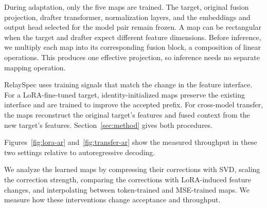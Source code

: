 During adaptation, only the five maps are trained. The target, original fusion projection, drafter transformer, normalization layers, and the embeddings and output head selected for the model pair remain frozen. A map can be rectangular when the target and drafter expect different feature dimensions. Before inference, we multiply each map into its corresponding fusion block, a composition of linear operations. This produces one effective projection, so inference needs no separate mapping operation.

RelaySpec uses training signals that match the change in the feature interface. For a LoRA-fine-tuned target, identity-initialized maps preserve the existing interface and are trained to improve the accepted prefix. For cross-model transfer, the maps reconstruct the original target's features and fused context from the new target's features. Section~\ref{sec:method} gives both procedures.

Figures~\ref{fig:lora-ar} and~\ref{fig:transfer-ar} show the measured throughput in these two settings relative to autoregressive decoding.

We analyze the learned maps by compressing their corrections with SVD, scaling the correction strength, comparing the corrections with LoRA-induced feature changes, and interpolating between token-trained and MSE-trained maps. We measure how these interventions change acceptance and throughput.
